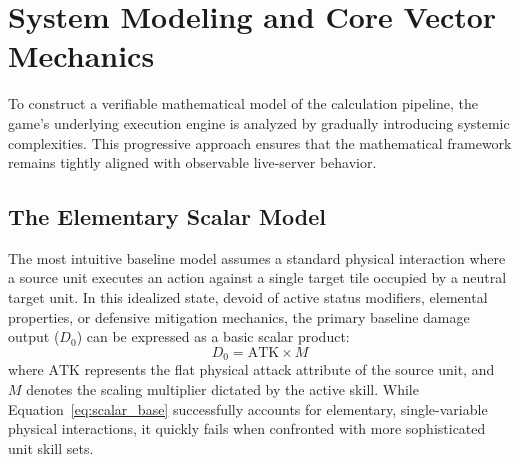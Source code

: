 \documentclass[twocolumn,10pt]{article}
\begin{document}
\section{System Modeling and Core Vector Mechanics}
\label{sec:derivation}

To construct a verifiable mathematical model of the calculation pipeline, the game's underlying execution engine is analyzed by gradually introducing systemic complexities. This progressive approach ensures that the mathematical framework remains tightly aligned with observable live-server behavior.

\subsection{The Elementary Scalar Model}
The most intuitive baseline model assumes a standard physical interaction where a source unit executes an action against a single target tile occupied by a neutral target unit. In this idealized state, devoid of active status modifiers, elemental properties, or defensive mitigation mechanics, the primary baseline damage output ($D_0$) can be expressed as a basic scalar product:
\begin{equation}
D_0 = \text{ATK} \times M
\label{eq:scalar_base}
\end{equation}
where $\text{ATK}$ represents the flat physical attack attribute of the source unit, and $M$ denotes the scaling multiplier dictated by the active skill. While Equation~\ref{eq:scalar_base} successfully accounts for elementary, single-variable physical interactions, it quickly fails when confronted with more sophisticated unit skill sets.
\end{document}
